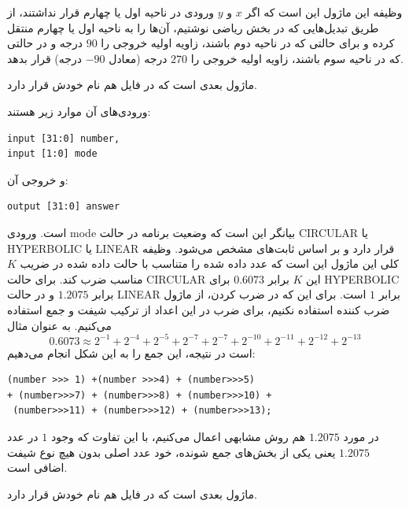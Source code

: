 \documentclass[12pt,titlepage,a4page , tikz , multi,table , svgnames,xcdraw]{article}
\begin{document}
وظیفه این ماژول این است که اگر $x$ و $y$ ورودی در ناحیه اول یا چهارم قرار نداشتند، از طریق تبدیل‌هایی که در بخش ریاضی نوشتیم، آن‌ها را به ناحیه اول یا چهارم منتقل کرده و برای حالتی که در ناحیه دوم باشند، زاویه اولیه خروجی را $90$ درجه و در حالتی که در ناحیه سوم باشند، زاویه اولیه خروجی را $270$ درجه (معادل $-90$ درجه) قرار بدهد.

\hrulefill

ماژول بعدی  است که در فایل هم نام خودش قرار دارد.

 
 ورودی‌های آن موارد زیر هستند:

\begin{latin}
\begin{verbatim}
input [31:0] number,
input [1:0] mode
\end{verbatim}
\end{latin}

و خروجی آن:

\begin{latin}
\begin{verbatim}
output [31:0] answer
\end{verbatim}
\end{latin}

است. ورودی mode بیانگر این است که وضعیت برنامه در حالت CIRCULAR یا HYPERBOLIC یا LINEAR قرار دارد و بر اساس ثابت‌های  مشخص می‌شود. وظیفه کلی این ماژول این است که عدد داده شده را متناسب با حالت داده شده در ضریب $K$ مناسب ضرب کند. برای حالت CIRCULAR این $K$ برابر $0.6073$ برای HYPERBOLIC برابر $1.2075$ و در حالت LINEAR برابر $1$ است. برای این که در ضرب کردن، از ماژول ضرب کننده استفاده نکنیم، برای ضرب در این اعداد از ترکیب شیفت و جمع استفاده می‌کنیم. به عنوان مثال
$$0.6073 \approx 2^{-1} + 2^{-4} + 2^{-5} + 2^{-7} + 2^{-7} + 2^{-10} + 2^{-11} + 2^{-12} + 2^{-13}$$
است در نتیجه، این جمع را به این شکل انجام می‌دهیم:

\begin{latin}
\begin{verbatim}
(number >>> 1) +(number >>>4) + (number>>>5)
+ (number>>>7) + (number>>>8) + (number>>>10) +
 (number>>>11) + (number>>>12) + (number>>>13);
\end{verbatim}
\end{latin}

در مورد $1.2075$ هم روش مشابهی اعمال می‌کنیم، با این تفاوت که وجود $1$ در عدد $1.2075$ یعنی یکی از بخش‌های جمع شونده، خود عدد اصلی بدون هیچ نوع شیفت اضافی است.

\hrulefill

ماژول بعدی  است که در فایل هم نام خودش قرار دارد.
\end{document}
